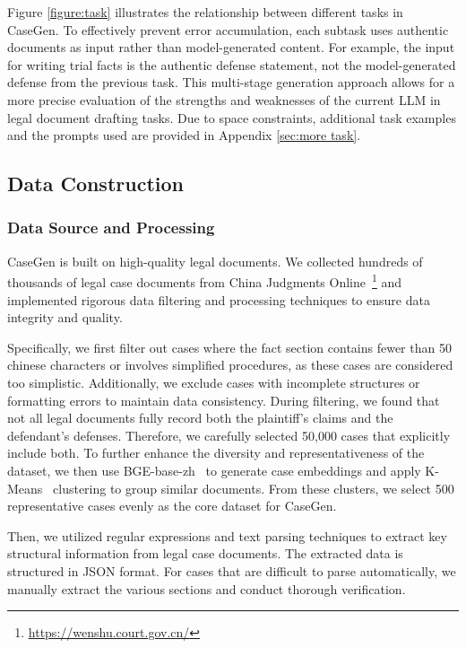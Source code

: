 Figure \ref{figure:task} illustrates the relationship between different tasks in CaseGen.
To effectively prevent error accumulation, each subtask uses authentic documents as input rather than model-generated content.
For example, the input for writing trial facts is the authentic defense statement, not the model-generated defense from the previous task.
This multi-stage generation approach allows for a more precise evaluation of the strengths and weaknesses of the current LLM in legal document drafting tasks.
Due to space constraints, additional task examples and the prompts used are provided in Appendix \ref{sec:more task}.











\subsection{Data Construction}


\subsubsection{Data Source and Processing}


CaseGen is built on high-quality legal documents. We collected hundreds of thousands of legal case documents from China Judgments Online~\footnote{\url{https://wenshu.court.gov.cn/}} and implemented rigorous data filtering and processing techniques to ensure data integrity and quality.

Specifically, we first filter out cases where the fact section contains fewer than 50 chinese characters or involves simplified procedures, as these cases are considered too simplistic. Additionally, we exclude cases with incomplete structures or formatting errors to maintain data consistency.
During filtering, we found that not all legal documents fully record both the plaintiff's claims and the defendant's defenses. Therefore, we carefully selected 50,000 cases that explicitly include both.
To further enhance the diversity and representativeness of the dataset, we then use BGE-base-zh~\cite{bge_embedding} to generate case embeddings and apply K-Means~\cite{ahmed2020k} clustering to group similar documents. From these clusters, we select 500 representative cases evenly as the core dataset for CaseGen.


Then, we utilized regular expressions and text parsing techniques to extract key structural information from legal case documents. The extracted data is structured in JSON format. For cases that are difficult to parse automatically, we manually extract the various sections and conduct thorough verification.



